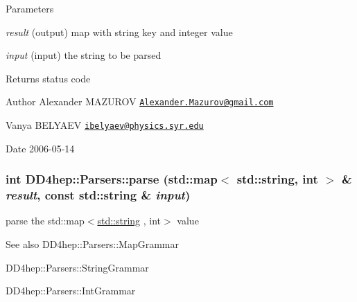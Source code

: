 \begin{DoxyParams}{Parameters}
\item[{\em result}](output) map with string key and integer value \item[{\em input}](input) the string to be parsed \end{DoxyParams}
\begin{DoxyReturn}{Returns}
status code
\end{DoxyReturn}
\begin{DoxyAuthor}{Author}
Alexander MAZUROV \href{mailto:Alexander.Mazurov@gmail.com}{\tt Alexander.Mazurov@gmail.com} 

Vanya BELYAEV \href{mailto:ibelyaev@physics.syr.edu}{\tt ibelyaev@physics.syr.edu} 
\end{DoxyAuthor}
\begin{DoxyDate}{Date}
2006-\/05-\/14 
\end{DoxyDate}
\hypertarget{namespace_d_d4hep_1_1_parsers_a0bb67dd0bd4f1932c18d9fdf190b0387}{
\subsubsection[{parse}]{\setlength{\rightskip}{0pt plus 5cm}int DD4hep::Parsers::parse (std::map$<$ std::string, int $>$ \& {\em result}, \/  const std::string \& {\em input})}}
\label{namespace_d_d4hep_1_1_parsers_a0bb67dd0bd4f1932c18d9fdf190b0387}


parse the {\ttfamily std::map$<$\hyperlink{classstd_1_1string}{std::string} , int$>$} value \begin{DoxySeeAlso}{See also}
DD4hep::Parsers::MapGrammar 

DD4hep::Parsers::StringGrammar 

DD4hep::Parsers::IntGrammar 
\end{DoxySeeAlso}

